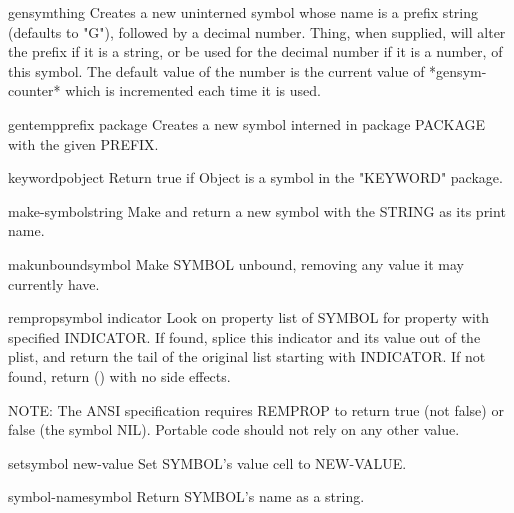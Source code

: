 \begin{function}{gensym}{\op thing}{}{}
  Creates a new uninterned symbol whose name is a prefix string (defaults
   to "G"), followed by a decimal number. Thing, when supplied, will
   alter the prefix if it is a string, or be used for the decimal number
   if it is a number, of this symbol. The default value of the number is
   the current value of *gensym-counter* which is incremented each time
   it is used.
\end{function}

\begin{function}{gentemp}{\op prefix package}{}{}
  Creates a new symbol interned in package PACKAGE with the given PREFIX.
\end{function}

\begin{function}{keywordp}{object}{}{}
  Return true if Object is a symbol in the "KEYWORD" package.
\end{function}

\begin{function}{make-symbol}{string}{}{}
  Make and return a new symbol with the STRING as its print name.
\end{function}

\begin{function}{makunbound}{symbol}{}{}
  Make SYMBOL unbound, removing any value it may currently have.
\end{function}

\begin{function}{remprop}{symbol indicator}{}{}
  Look on property list of SYMBOL for property with specified
  INDICATOR. If found, splice this indicator and its value out of
  the plist, and return the tail of the original list starting with
  INDICATOR. If not found, return () with no side effects.

  NOTE: The ANSI specification requires REMPROP to return true (not false)
  or false (the symbol NIL). Portable code should not rely on any other value.
\end{function}

\begin{function}{set}{symbol new-value}{}{}
  Set SYMBOL's value cell to NEW-VALUE.
\end{function}

\begin{function}{symbol-name}{symbol}{}{}
  Return SYMBOL's name as a string.
\end{function}

